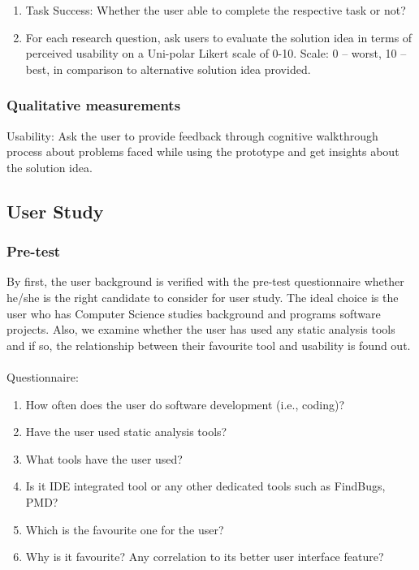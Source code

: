 \begin{enumerate}
\item Task Success: Whether the user able to complete the respective task or not?
\item For each research question, ask users to evaluate the solution idea in terms of perceived usability on a Uni-polar Likert scale of 0-10. Scale: 0 – worst, 10 – best, in comparison to alternative solution idea provided.
\end{enumerate} 

\subsubsection{Qualitative measurements} 

Usability: Ask the user to provide feedback through cognitive walkthrough process about problems faced while using the prototype and get insights about the solution idea. \\

\subsection{User Study}

\subsubsection{Pre-test}

By first, the user background is verified with the pre-test questionnaire whether he/she is the right candidate to consider for user study. The ideal choice is the user who has Computer Science studies background and programs software projects. Also, we examine whether the user has used any static analysis tools and if so, the relationship between their favourite tool and usability is found out. \\ \\

Questionnaire: \\

\begin{enumerate}
\item How often does the user do software development (i.e., coding)?
\item Have the user used static analysis tools?
\item What tools have the user used?
\item Is it IDE integrated tool or any other dedicated tools such as FindBugs, PMD?
\item Which is the favourite one for the user?  
\item Why is it favourite? Any correlation to its better user interface feature?
\end{enumerate}

